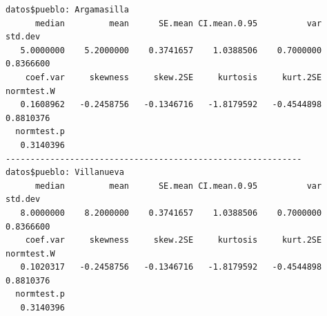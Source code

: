 \documentclass[
  ignorenonframetext,
]{beamer}
\newenvironment{Shaded}{\begin{snugshade}}{\end{snugshade}}
\newcommand{\AttributeTok}[1]{\textcolor[rgb]{0.40,0.45,0.13}{#1}}
\newcommand{\CommentTok}[1]{\textcolor[rgb]{0.37,0.37,0.37}{#1}}
\newcommand{\ConstantTok}[1]{\textcolor[rgb]{0.56,0.35,0.01}{#1}}
\newcommand{\DecValTok}[1]{\textcolor[rgb]{0.68,0.00,0.00}{#1}}
\newcommand{\FunctionTok}[1]{\textcolor[rgb]{0.28,0.35,0.67}{#1}}
\newcommand{\NormalTok}[1]{\textcolor[rgb]{0.00,0.23,0.31}{#1}}
\newcommand{\OtherTok}[1]{\textcolor[rgb]{0.00,0.23,0.31}{#1}}
\newcommand{\SpecialCharTok}[1]{\textcolor[rgb]{0.37,0.37,0.37}{#1}}
\newcommand{\StringTok}[1]{\textcolor[rgb]{0.13,0.47,0.30}{#1}}
\begin{document}
\begin{frame}[fragile]
\begin{Shaded}
\end{Shaded}

\begin{verbatim}
datos$pueblo: Argamasilla
      median         mean      SE.mean CI.mean.0.95          var      std.dev 
   5.0000000    5.2000000    0.3741657    1.0388506    0.7000000    0.8366600 
    coef.var     skewness     skew.2SE     kurtosis     kurt.2SE   normtest.W 
   0.1608962   -0.2458756   -0.1346716   -1.8179592   -0.4544898    0.8810376 
  normtest.p 
   0.3140396 
------------------------------------------------------------ 
datos$pueblo: Villanueva
      median         mean      SE.mean CI.mean.0.95          var      std.dev 
   8.0000000    8.2000000    0.3741657    1.0388506    0.7000000    0.8366600 
    coef.var     skewness     skew.2SE     kurtosis     kurt.2SE   normtest.W 
   0.1020317   -0.2458756   -0.1346716   -1.8179592   -0.4544898    0.8810376 
  normtest.p 
   0.3140396 
\end{verbatim}

\begin{Shaded}
\end{Shaded}
\end{frame}
\end{document}
